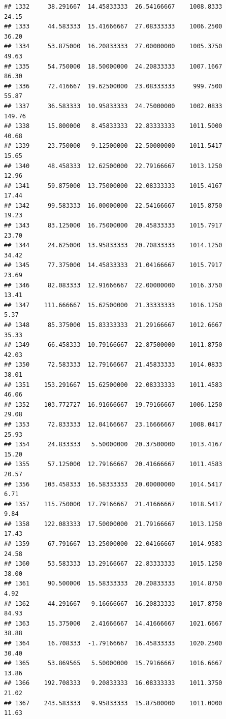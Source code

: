\documentclass[
]{article}
\begin{document}
\begin{verbatim}
## 1332     38.291667  14.45833333  26.54166667    1008.8333       24.15
## 1333     44.583333  15.41666667  27.08333333    1006.2500       36.20
## 1334     53.875000  16.20833333  27.00000000    1005.3750       49.63
## 1335     54.750000  18.50000000  24.20833333    1007.1667       86.30
## 1336     72.416667  19.62500000  23.08333333     999.7500       55.87
## 1337     36.583333  10.95833333  24.75000000    1002.0833      149.76
## 1338     15.800000   8.45833333  22.83333333    1011.5000       40.68
## 1339     23.750000   9.12500000  22.50000000    1011.5417       15.65
## 1340     48.458333  12.62500000  22.79166667    1013.1250       12.96
## 1341     59.875000  13.75000000  22.08333333    1015.4167       17.44
## 1342     99.583333  16.00000000  22.54166667    1015.8750       19.23
## 1343     83.125000  16.75000000  20.45833333    1015.7917       23.70
## 1344     24.625000  13.95833333  20.70833333    1014.1250       34.42
## 1345     77.375000  14.45833333  21.04166667    1015.7917       23.69
## 1346     82.083333  12.91666667  22.00000000    1016.3750       13.41
## 1347    111.666667  15.62500000  21.33333333    1016.1250        5.37
## 1348     85.375000  15.83333333  21.29166667    1012.6667       35.33
## 1349     66.458333  10.79166667  22.87500000    1011.8750       42.03
## 1350     72.583333  12.79166667  21.45833333    1014.0833       38.01
## 1351    153.291667  15.62500000  22.08333333    1011.4583       46.06
## 1352    103.772727  16.91666667  19.79166667    1006.1250       29.08
## 1353     72.833333  12.04166667  23.16666667    1008.0417       25.93
## 1354     24.833333   5.50000000  20.37500000    1013.4167       15.20
## 1355     57.125000  12.79166667  20.41666667    1011.4583       20.57
## 1356    103.458333  16.58333333  20.00000000    1014.5417        6.71
## 1357    115.750000  17.79166667  21.41666667    1018.5417        9.84
## 1358    122.083333  17.50000000  21.79166667    1013.1250       17.43
## 1359     67.791667  13.25000000  22.04166667    1014.9583       24.58
## 1360     53.583333  13.29166667  22.83333333    1015.1250       38.00
## 1361     90.500000  15.58333333  20.20833333    1014.8750        4.92
## 1362     44.291667   9.16666667  16.20833333    1017.8750       84.93
## 1363     15.375000   2.41666667  14.41666667    1021.6667       38.88
## 1364     16.708333  -1.79166667  16.45833333    1020.2500       30.40
## 1365     53.869565   5.50000000  15.79166667    1016.6667       13.86
## 1366    192.708333   9.20833333  16.08333333    1011.3750       21.02
## 1367    243.583333   9.95833333  15.87500000    1011.0000       11.63

\end{verbatim}
\end{document}
